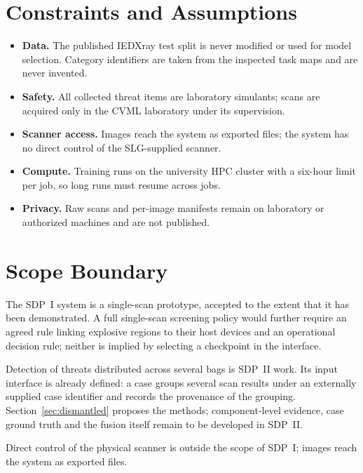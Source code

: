 \section{Constraints and Assumptions}\label{sec:constraints}
\begin{itemize}
\item \textbf{Data.} The published IEDXray test split is never modified or used for
model selection. Category identifiers are taken from the inspected task maps and
are never invented.
\item \textbf{Safety.} All collected threat items are laboratory simulants; scans
are acquired only in the CVML laboratory under its supervision.
\item \textbf{Scanner access.} Images reach the system as exported files; the
system has no direct control of the SLG-supplied scanner.
\item \textbf{Compute.} Training runs on the university HPC cluster with a six-hour
limit per job, so long runs must resume across jobs.
\item \textbf{Privacy.} Raw scans and per-image manifests remain on laboratory or
authorized machines and are not published.
\end{itemize}

\section{Scope Boundary}\label{sec:boundary}
The SDP~I system is a single-scan prototype, accepted to the extent that it has
been demonstrated. A full single-scan screening policy would further require an
agreed rule linking explosive regions to their host devices and an operational
decision rule; neither is implied by selecting a checkpoint in the interface.

Detection of threats distributed across several bags is SDP~II work. Its input
interface is already defined: a case groups several scan results under an
externally supplied case identifier and records the provenance of the grouping.
Section~\ref{sec:dismantled} proposes the methods; component-level evidence, case
ground truth and the fusion itself remain to be developed in SDP~II.

Direct control of the physical scanner is outside the scope of SDP~I; images reach the
system as exported files.
